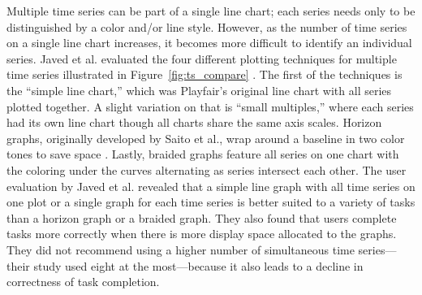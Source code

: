 Multiple time series can be part of a single line chart; each series needs only to be distinguished by a color and/or line style.  However, as the number of time series on a single line chart increases, it becomes more difficult to identify an individual series.  Javed et al. evaluated the four different plotting techniques for multiple time series illustrated in Figure~\ref{fig:ts_compare} \cite{javed2010}.  The first of the techniques is the ``simple line chart,'' which was Playfair's original line chart with all series plotted together.  A slight variation on that is ``small multiples,'' where each series had its own line chart though all charts share the same axis scales.  Horizon graphs, originally developed by Saito et al., wrap around a baseline in two color tones to save space \cite{saitoTwoTone}.  Lastly, braided graphs feature all series on one chart with the coloring under the curves alternating as series intersect each other.  The user evaluation by Javed et al. revealed that a simple line graph with all time series on one plot or a single graph for each time series is better suited to a variety of tasks than a horizon graph or a braided graph.  They also found that users complete tasks more correctly when there is more display space allocated to the graphs.  They did not recommend using a higher number of simultaneous time series---their study used eight at the most---because it also leads to a decline in correctness of task completion.

